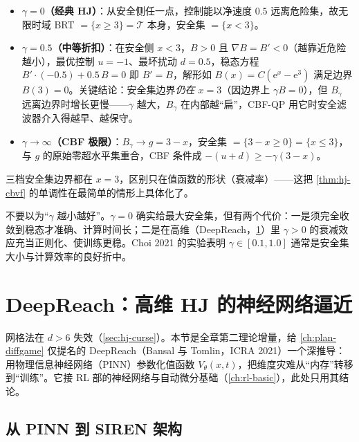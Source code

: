 \begin{itemize}
  \item \textbf{$\gamma=0$（经典 HJ）}：从安全侧任一点，控制能以净速度 $0.5$ 远离危险集，故无限时域 BRT $=\{x\ge3\}=\mathcal T$ 本身，安全集 $=\{x<3\}$。
  \item \textbf{$\gamma=0.5$（中等折扣）}：在安全侧 $x<3$，$B>0$ 且 $\nabla B=B'<0$（越靠近危险越小），最优控制 $u=-1$、最坏扰动 $d=0.5$，稳态方程 $B'\cdot(-0.5)+0.5\,B=0$ 即 $B'=B$，解形如 $B(x)=C(\mathrm e^{x}-\mathrm e^{3})$ 满足边界 $B(3)=0$。关键结论：安全集边界\emph{仍在 $x=3$}（因边界上 $\gamma B=0$），但 $B_\gamma$ 远离边界时增长更慢——$\gamma$ 越大，$B_\gamma$ 在内部越“扁”，CBF-QP 用它时安全滤波器介入得越早、越保守。
  \item \textbf{$\gamma\to\infty$（CBF 极限）}：$B_\gamma\to g=3-x$，安全集 $=\{3-x\ge0\}=\{x\le3\}$，与 $g$ 的原始零超水平集重合，CBF 条件成 $-(u+d)\ge-\gamma(3-x)$。
\end{itemize}

\noindent{}三档安全集边界都在 $x=3$，区别只在值函数的形状（衰减率）——这把 \cref{thm:hj-cbvf} 的单调性在最简单的情形上具体化了。

\begin{remark}
不要以为“$\gamma$ 越小越好”。$\gamma=0$ 确实给最大安全集，但有两个代价：一是须完全收敛到稳态才准确、计算时间长；二是在高维（DeepReach，\cref{sec:hj-deepreach}）里 $\gamma>0$ 的衰减效应充当正则化、使训练更稳。Choi 2021 的实验表明 $\gamma\in[0.1,1.0]$ 通常是安全集大小与计算效率的良好折中。
\end{remark}

\section{DeepReach：高维 HJ 的神经网络逼近}
\label{sec:hj-deepreach}

网格法在 $d>6$ 失效（\cref{sec:hj-curse}）。本节是全章第二理论增量，给 \cref{ch:plan-diffgame} 仅提名的 DeepReach（Bansal 与 Tomlin，ICRA 2021）一个深推导\cite{bansal2021deepreach}：用物理信息神经网络（PINN）参数化值函数 $V_\theta(x,t)$，把维度灾难从“内存”转移到“训练”。它接 RL 部的神经网络与自动微分基础（\cref{ch:rl-basic}），此处只用其结论。

\subsection{从 PINN 到 SIREN 架构}
\label{sec:hj-pinn}

